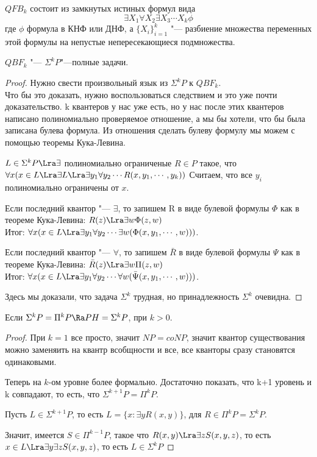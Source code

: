 \begin{Def}
$QFB_k$ состоит из замкнутых истиных формул вида
$$\exists X_1 \forall X_2 \exists X_3 \cdots X_k \phi$$
где $\phi$ формула в КНФ или ДНФ, а $\{X_i\}_{i = 1}^{k}$ "---
разбиение множества переменных этой формулы на непустые непересекающиеся 
подмножества. 
\end{Def}
\begin{theorem}
$QBF_k$ "--- $\Sigma^kP$"---полные задачи. 
\end{theorem}
\begin{proof}
Нужно свести произвольный язык из $\Sigma^{k}P$ к $QBF_k$.\\ 
Что бы это доказать, нужно воспользоваться следствием и это 
уже почти доказательство. k квантеров у нас уже есть, но 
у нас после этих квантеров написано полиномиально проверяемое 
отношение, а мы бы хотели, что бы была записана булева формула.
Из отношения сделать булеву формулу мы можем с помощью теоремы 
Кука-Левина. 

$L \in \Sigma^{k}P \Lra \exists$ полиномиально ограниченые $R \in P$
такое, что $\forall x(x \in L \Lra \exists L \Lra \exists y_1 \forall y_2 \cdots R(x, y_1, \cdots, y_k))$
Считаем, что все $y_i$ полиномиально ограничены от $x$.

Если последний квантор "--- $\exists$, то запишем R в виде булевой формулы 
$\Phi$ как в теореме Кука-Левина: $R(z) \Lra \exists w \Phi(z,w)$\\
Итог: $\forall x(x \in L \Lra \exists y_1 \forall y_2 \cdots \exists w(\Phi(x, y_1, \cdots, w)))$.

Если последний квантор "--- $\forall$, то запишем $\bar R$ в виде булевой формулы 
$\Psi$ как в теореме Кука-Левина: $\bar R(z) \Lra \exists w \Pi(z,w)$\\
Итог: $\forall x(x \in L \Lra \exists y_1 \forall y_2 \cdots \forall w(\bar{\Psi}(x, y_1, \cdots, w)))$.

Здесь мы доказали, что задача $\Sigma^k$ трудная, но принадлежность 
$\Sigma^k$ очевидна. 
\end{proof}
\begin{theorem}
Если $\Sigma^k P = \Pi^k P \Ra PH = \Sigma^kP$, при
$k > 0$. 
\end{theorem}
\begin{proof}
При $k = 1$ все просто, значит $NP = coNP$, значит квантор
существования можно заменяить на квантр всобщности и все,
все кванторы сразу становятся одинаковыми.

Теперь на $k$-ом уровне более формально.
Достаточно показать, что k+1 уровень и k совпадают, то есть,
что $\Sigma^{k + 1}P = \Pi^kP$.

Пусть $L \in \Sigma^{k + 1}P$, то есть $L = \{x \colon \exists y R(x, y)\}$,
для $R \in \Pi^k P = \Sigma^k P$.

Значит, имеется $S \in \Pi^{k - 1}P$, такое что $R(x, y) \Lra \exists z S(x, y, z)$, то есть
$x \in L \Lra \exists y \exists z S(x,y, z)$, то есть $L \in \Sigma^{k}P$ 
\end{proof}
